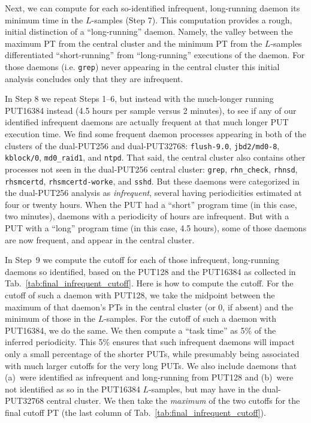 \documentclass[letter]{ieice}
\begin{document}
Next, we can compute for each so-identified infrequent, long-running daemon its
minimum time in the $L$-samples (Step 7). 
This computation provides a rough, initial distinction of a ``long-running'' daemon. 
Namely, the valley between the maximum PT from the central cluster 
and the minimum PT from the $L$-samples differentiated ``short-running'' 
from ``\hbox{long-running}'' executions of the daemon. 
For those daemons (i.e. {\tt grep}) never appearing in the central cluster 
this initial analysis concludes only that they are infrequent.

In Step 8 we repeat Steps 1--6, but instead with the much-longer running
PUT16384 instead (4.5 hours per sample versus 2 minutes), to see 
if any of our identified infrequent daemons are actually frequent 
at that much longer PUT execution time. 
We find some frequent daemon processes appearing in both of the 
clusters of the dual-PUT256 and dual-PUT32768: 
{\tt flush-9.0}, {\tt jbd2/md0-8}, {\tt kblock/0}, {\tt md0\_raid1}, 
and {\tt ntpd}. That said, the central cluster also contains other
  processes not seen in the dual-PUT256 central cluster: 
  {\tt grep}, {\tt rhn\_check}, {\tt rhnsd}, {\tt rhsmcertd}, 
  {\tt rhsmcertd-worke}, and {\tt sshd}. 
  But these daemons were categorized in the \hbox{dual-PUT256} analysis as {\em
  infrequent}, several having periodicities estimated at four or twenty hours.
When the PUT had a ``short'' 
program time (in this case, two minutes), daemons with a periodicity of
hours are infrequent. But with a PUT with a ``long'' program time (in this
case, 4.5 hours), some of those daemons are now frequent, and appear in the 
central cluster.

In Step~9 we compute 
the cutoff for each of those infrequent, long-running daemons so
identified, based on the PUT128 and the 
PUT16384 as collected in Tab.~\ref{tab:final_infrequent_cutoff}. 
Here is how to compute the cutoff. For the cutoff of such a daemon with PUT128, 
we take the midpoint between the maximum of that daemon's PTs in the 
central cluster (or 0, if absent) and the minimum of those in the $L$-samples. 
For the cutoff of such a daemon with PUT16384, we do the same. 
We then compute a ``task time'' as 5\% of the inferred periodicity. 
This 5\% ensures that such infrequent daemons will impact 
only a small percentage of the shorter PUTs, while presumably being 
associated with much larger cutoffs for the very long PUTs. 
We also include daemons that (a)~were identified as infrequent and 
\hbox{long-running} from PUT128 and (b)~were not identified as so in the PUT16384 
\hbox{$L$-samples}, but may have in the \hbox{dual-PUT32768} central cluster. 
We then take the {\em maximum} of the two cutoffs for the final cutoff PT 
(the last column of Tab.~\ref{tab:final_infrequent_cutoff}). 
\end{document}
